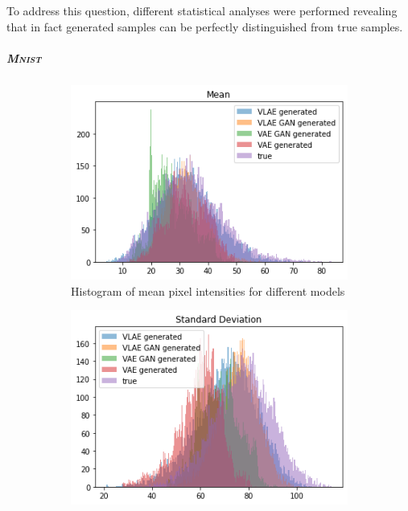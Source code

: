 To address this question, different statistical analyses were performed revealing that in fact generated samples can be perfectly distinguished from true samples.

\subparagraph{\textsc{Mnist}}

\begin{figure}
    \centering
    \begin{subfigure}{0.48\textwidth}
        \centering
        \includegraphics[width=\textwidth]{images/generated_vs_true/mnist_vs_models_mean.png}
        \caption{Histogram of mean pixel intensities for different models}
        \label{subfig:mean_generated_vs_true}
    \end{subfigure}
    \hfill
    \begin{subfigure}{0.48\textwidth}
        \centering
        \includegraphics[width=\textwidth]{images/generated_vs_true/mnist_vs_models_sd.png}

\end{subfigure}
\end{figure}
